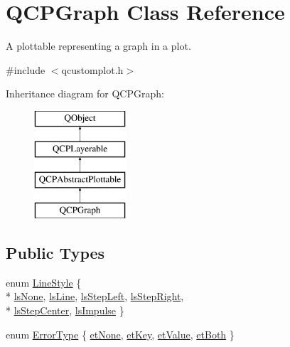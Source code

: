 \hypertarget{class_q_c_p_graph}{}\section{Q\+C\+P\+Graph Class Reference}
\label{class_q_c_p_graph}


A plottable representing a graph in a plot.  




{\ttfamily \#include $<$qcustomplot.\+h$>$}

Inheritance diagram for Q\+C\+P\+Graph\+:\begin{figure}[H]
\begin{center}
\leavevmode
\includegraphics[height=4.000000cm]{class_q_c_p_graph}
\end{center}
\end{figure}
\subsection*{Public Types}
\begin{DoxyCompactItemize}
\item 
enum \hyperlink{class_q_c_p_graph_ad60175cd9b5cac937c5ee685c32c0859}{Line\+Style} \{ \\*
\hyperlink{class_q_c_p_graph_ad60175cd9b5cac937c5ee685c32c0859aea9591b933733cc7b20786b71e60fa04}{ls\+None}, 
\hyperlink{class_q_c_p_graph_ad60175cd9b5cac937c5ee685c32c0859a3c42a27b15aa3c92d399082fad8b7515}{ls\+Line}, 
\hyperlink{class_q_c_p_graph_ad60175cd9b5cac937c5ee685c32c0859ae10568bda57836487d9dec5eba1d6c6e}{ls\+Step\+Left}, 
\hyperlink{class_q_c_p_graph_ad60175cd9b5cac937c5ee685c32c0859a9c37951f7d11aa070100fd16f2935c9e}{ls\+Step\+Right}, 
\\*
\hyperlink{class_q_c_p_graph_ad60175cd9b5cac937c5ee685c32c0859a5adf7b04da215a40a764c21294ea7366}{ls\+Step\+Center}, 
\hyperlink{class_q_c_p_graph_ad60175cd9b5cac937c5ee685c32c0859aa3b358b4ae7cca94aceeb8e529c12ebb}{ls\+Impulse}
 \}
\item 
enum \hyperlink{class_q_c_p_graph_ad23b514404bd2cb3216f57c90904d6af}{Error\+Type} \{ \hyperlink{class_q_c_p_graph_ad23b514404bd2cb3216f57c90904d6afaeae745e7cc1766bb8546e35d4b76a711}{et\+None}, 
\hyperlink{class_q_c_p_graph_ad23b514404bd2cb3216f57c90904d6afa2a5d89cd76fb8b6b18d71b8f6f6c0f43}{et\+Key}, 
\hyperlink{class_q_c_p_graph_ad23b514404bd2cb3216f57c90904d6afa147022ccdc49f6bd48f904cb4f61872e}{et\+Value}, 
\hyperlink{class_q_c_p_graph_ad23b514404bd2cb3216f57c90904d6afa761cb7d61670c1e2efecccd8974409ab}{et\+Both}
 \}
\end{DoxyCompactItemize}
